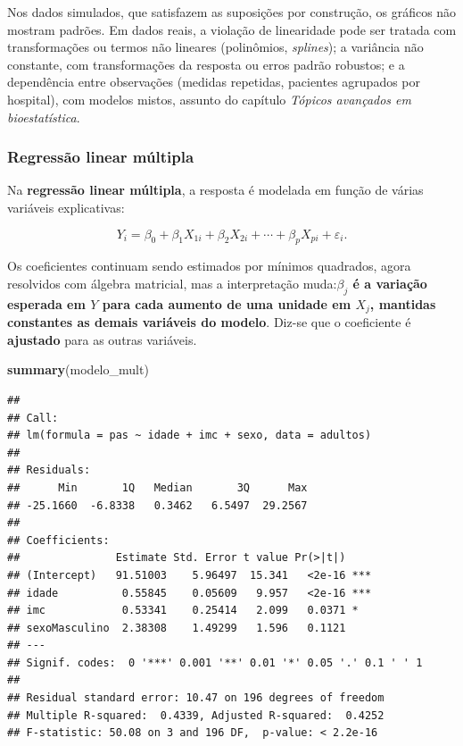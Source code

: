 \documentclass[
]{book}
\newenvironment{Shaded}{\begin{snugshade}}{\end{snugshade}}
\newcommand{\FunctionTok}[1]{\textcolor[rgb]{0.13,0.29,0.53}{\textbf{#1}}}
\newcommand{\NormalTok}[1]{#1}
\begin{document}
Nos dados simulados, que satisfazem as suposições por construção, os gráficos não mostram padrões. Em dados reais, a violação de linearidade pode ser tratada com transformações ou termos não lineares (polinômios, \emph{splines}); a variância não constante, com transformações da resposta ou erros padrão robustos; e a dependência entre observações (medidas repetidas, pacientes agrupados por hospital), com modelos mistos, assunto do capítulo \emph{Tópicos avançados em bioestatística}.

\subsubsection{Regressão linear múltipla}\label{regressuxe3o-linear-muxfaltipla}

Na \textbf{regressão linear múltipla}, a resposta é modelada em função de várias variáveis explicativas:

\[
Y_i = \beta_0 + \beta_1 X_{1i} + \beta_2 X_{2i} + \cdots + \beta_p X_{pi} + \varepsilon_i .
\]

Os coeficientes continuam sendo estimados por mínimos quadrados, agora resolvidos com álgebra matricial, mas a interpretação muda:\textbf{\(\beta_j\) é a variação esperada em \(Y\) para cada aumento de uma unidade em \(X_j\), mantidas constantes as demais variáveis do modelo}. Diz-se que o coeficiente é \textbf{ajustado} para as outras variáveis.

\begin{Shaded}
\begin{Highlighting}[]
\FunctionTok{summary}\NormalTok{(modelo\_mult)}
\end{Highlighting}
\end{Shaded}

\begin{verbatim}
## 
## Call:
## lm(formula = pas ~ idade + imc + sexo, data = adultos)
## 
## Residuals:
##      Min       1Q   Median       3Q      Max 
## -25.1660  -6.8338   0.3462   6.5497  29.2567 
## 
## Coefficients:
##               Estimate Std. Error t value Pr(>|t|)    
## (Intercept)   91.51003    5.96497  15.341   <2e-16 ***
## idade          0.55845    0.05609   9.957   <2e-16 ***
## imc            0.53341    0.25414   2.099   0.0371 *  
## sexoMasculino  2.38308    1.49299   1.596   0.1121    
## ---
## Signif. codes:  0 '***' 0.001 '**' 0.01 '*' 0.05 '.' 0.1 ' ' 1
## 
## Residual standard error: 10.47 on 196 degrees of freedom
## Multiple R-squared:  0.4339, Adjusted R-squared:  0.4252 
## F-statistic: 50.08 on 3 and 196 DF,  p-value: < 2.2e-16
\end{verbatim}
\end{document}
